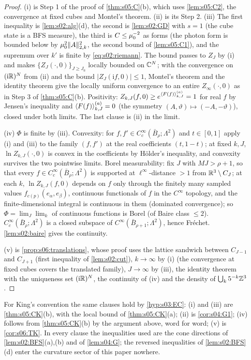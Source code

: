 \begin{proof}
(i) is Step 1 of the proof of \cref{thm:s05:C}(b), which uses \cref{lem:s05:C2}, the convergence at fixed cubes and Montel's theorem. (ii) is its Step 2. (iii) The first inequality is \cref{lem:s02:alg}(d), the second is \cref{lem:s02:GD} with $s=1$ (the cube state is a BFS measure), the third is $C\le\mu_0^{-2}$ as forms (the photon form is bounded below by $\mu_0^2\lVert A\rVert^2_{2,k}$, the second bound of \cref{lem:s05:C1}), and the supremum over $k'$ is finite by \eqref{eq:s02:riemann}. The bound passes to $Z_J$ by (i) and makes $\{Z_J(\cdot,0)\}_{J\ge J_0}$ locally bounded on $\mathbb C^N$; with the convergence on $(\mathrm i\mathbb R)^N$ from (ii) and the bound $|Z_J(\mathrm if,0)|\le1$, Montel's theorem and the identity theorem give the locally uniform convergence to an entire $Z_\infty(\cdot,0)$ as in Step 3 of \cref{thm:s05:C}(b). Positivity: $Z_{k,J}(f,0)\ge e^{\langle F(f)\rangle^{(a)}_{k,J}}=1$ for real $f$ by Jensen's inequality and $\langle F(f)\rangle^{(a)}_{k,J}=0$ (the symmetry $(A,\vartheta)\mapsto(-A,-\vartheta)$), closed under both limits. The last clause is (ii) in the limit.

(iv) $\Phi$ is finite by (iii). Convexity: for $f,f'\in C^\infty_c(\bar B_\rho;\Lambda^2)$ and $t\in[0,1]$ apply (i) and (iii) to the family $(f,f')$ at the real coefficients $(t,1-t)$; at fixed $k,J$, $\ln Z_{k,J}(\cdot,0)$ is convex in the coefficients by H\"older's inequality, and convexity survives the two pointwise limits. Borel measurability: fix $J$ with $MJ>\rho+1$, so that every $f\in C^\infty_c(\bar B_\rho;\Lambda^2)$ is supported at $\ell^\infty$-distance $>1$ from $\mathbb R^3\setminus C_J$; at each $k$, $\ln Z_{k,J}(f,0)$ depends on $f$ only through the finitely many sampled values $f_{c(p)}(e_\alpha,e_\beta)$, continuous functionals of $f$ in the $C^\infty$ topology, and the finite-dimensional integral is continuous in them (dominated convergence); so $\Phi=\lim_J\lim_k$ of continuous functions is Borel (of Baire class $\le2$). $C^\infty_c(\bar B_\rho;\Lambda^2)$ is a closed subspace of $C^\infty(\bar B_{\rho+1};\Lambda^2)$, hence Fr\'echet. \cref{lem:s02:baire} gives the continuity.

(v) is \cref{prop:s06:translations}, whose proof uses the lattice sandwich between $C_{J-1}$ and $C_{J+1}$ (first inequality of \cref{lem:s02:cut}), $k\to\infty$ by (i) (the convergence at fixed cubes covers the translated family), $J\to\infty$ by (iii), the identity theorem with the uniqueness set $(\mathrm i\mathbb R)^N$, the continuity of (iv) and the density of $\bigcup_k5^{-k}\mathbb Z^3$.
\end{proof}

For King's convention the same clauses hold by \cref{hyp:s03:EC}: (i) and (iii) are \cref{thm:s05:CK}(b), with the local bound of \cref{thm:s05:CK}(a); (ii) is \cref{cor:s04:G1}; (iv) follows from \cref{thm:s05:CK}(b) by the argument above, word for word; (v) is \cref{cor:s06:TK}. In every clause the inequalities used are the cone directions of \cref{lem:s02:BFS}(a),(b) and of \cref{lem:s04:G}; the reversed inequalities of \cref{lem:s02:BFS}(d) enter the curvature sector of this paper nowhere.
